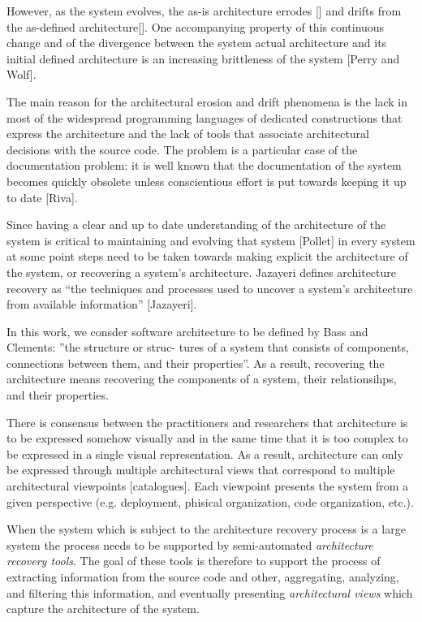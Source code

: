 \documentclass[preprint,12pt]{elsarticle}
\begin{document}
However, as the system evolves, the as-is architecture errodes [] and drifts from the as-defined architecture[]. One accompanying property of this continuous change and of the divergence between the system actual architecture and its initial defined architecture is an increasing brittleness of the system [Perry and Wolf]. 

The main reason for the architectural erosion and drift phenomena is the lack in most of the widespread programming languages of dedicated constructions that express the architecture and the lack of tools that associate architectural decisions with the source code. The problem is a particular case of the documentation problem: it is well known that the documentation of the system becomes quickly obsolete unless conscientious effort is put towards keeping it up to date [Riva].

Since having a clear and up to date understanding of the architecture of the system is critical to maintaining and evolving that system [Pollet] in every system at some point steps need to be taken towards making explicit the architecture of the system, or recovering a system’s architecture. Jazayeri defines architecture recovery as “the techniques and processes used to uncover a system’s architecture from available information” [Jazayeri]. 

In this work, we consder software architecture to be defined by Bass and Clements: ”the structure or struc- tures of a system that consists of components, connections between them, and their properties”. As a result, recovering the architecture means recovering the components of a system, their relationsihps, and their properties. 

There is consensus between the practitioners and researchers that architecture is to be expressed somehow visually and in the same time that it is too complex to be expressed in a single visual representation. As a result, architecture can only be expressed through multiple architectural views that correspond to multiple architectural viewpoints [catalogues]. Each viewpoint presents the system from a given perspective (e.g. deployment, phisical organization, code organization, etc.).

When the system which is subject to the architecture recovery process is a large system the process needs to be supported by semi-automated {\em architecture recovery tools}. The goal of these tools is therefore to support the process of extracting information from the source code and other, aggregating, analyzing, and filtering this information, and eventually presenting {\em architectural views} which capture the architecture of the system. 
\end{document}
